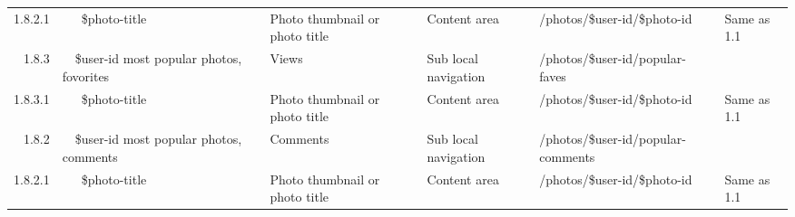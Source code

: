 \documentclass[12pt,a4paper]{article}
\begin{document}
\begin{landscape}
\begin{table}[h!b!p!]
\begin{center}
\begin{tiny}
\begin{tabular}{r|l|l|l|l|p{3cm}}
                  1.8.2.1 &
                  ~~~\$photo-title &
                  Photo thumbnail or photo title &
                  Content area &
                  /photos/\$user-id/\$photo-id &
                  Same as 1.1 \\

                1.8.3 &
                ~~\$user-id most popular photos, fovorites &
                Views &
                Sub local navigation &
                /photos/\$user-id/popular-faves &
                \\

                  1.8.3.1 &
                  ~~~\$photo-title &
                  Photo thumbnail or photo title &
                  Content area &
                  /photos/\$user-id/\$photo-id &
                  Same as 1.1 \\

                1.8.2 &
                ~~\$user-id most popular photos, comments &
                Comments &
                Sub local navigation &
                /photos/\$user-id/popular-comments &
                \\

                  1.8.2.1 &
                  ~~~\$photo-title &
                  Photo thumbnail or photo title &
                  Content area &
                  /photos/\$user-id/\$photo-id &
                  Same as 1.1 \\

          \end{tabular}
        \rm
      \end{tiny}
    \end{center}
  \end{table}
\end{landscape}
\end{document}
